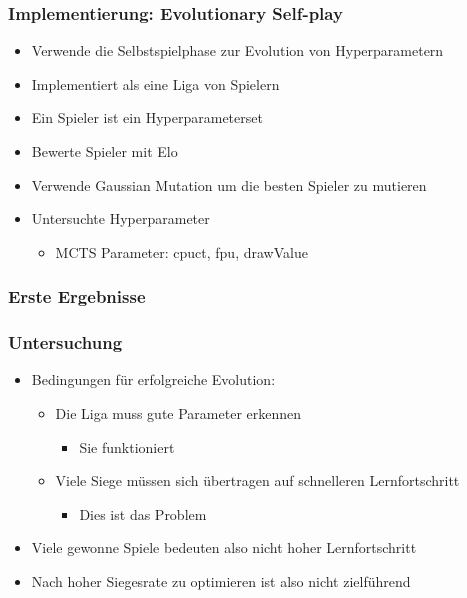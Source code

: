\begin{frame}
 \frametitle{Implementierung: Evolutionary Self-play}
  


\begin{itemize}
  \item \pause Verwende die Selbstspielphase zur Evolution von Hyperparametern
  \item \pause Implementiert als eine Liga von Spielern
  \item \pause Ein Spieler ist ein Hyperparameterset
  \item \pause Bewerte Spieler mit Elo
  \item \pause Verwende Gaussian Mutation um die besten Spieler zu mutieren
\end{itemize}

\begin{itemize}
  \item \pause Untersuchte Hyperparameter
\begin{itemize}
  \item \pause MCTS Parameter: cpuct, fpu, drawValue
\end{itemize}
\end{itemize}

  
\end{frame}
\begin{frame}
 \frametitle{Erste Ergebnisse}
  



  
\end{frame}
\begin{frame}
 \frametitle{Untersuchung}
  


\begin{itemize}
  \item \pause Bedingungen für erfolgreiche Evolution:
\begin{itemize}
  \item \pause Die Liga muss gute Parameter erkennen
\begin{itemize}
  \item \pause Sie funktioniert
\end{itemize}
  \item \pause Viele Siege müssen sich übertragen auf schnelleren Lernfortschritt
\begin{itemize}
  \item \pause Dies ist das Problem
\end{itemize}
\end{itemize}
  \item \pause Viele gewonne Spiele bedeuten also nicht hoher Lernfortschritt
  \item \pause Nach hoher Siegesrate zu optimieren ist also nicht zielführend
\end{itemize}

  
\end{frame}


